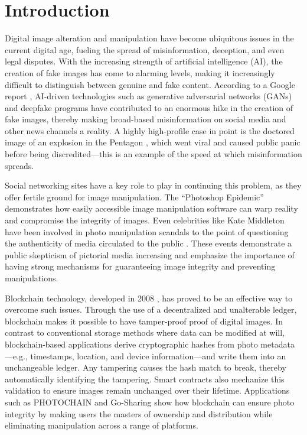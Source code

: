 \chapter{Introduction}

Digital image alteration and manipulation have become ubiquitous issues in the current digital age,
fueling the spread of misinformation, deception, and even legal disputes. With the increasing
strength of artificial intelligence (AI), the creation of fake images has come to alarming levels,
making it increasingly difficult to distinguish between genuine and fake content. According
to a Google report \cite{yang2024}, AI-driven technologies such as generative adversarial
networks (GANs) and deepfake programs have contributed to an enormous hike in the creation of
fake images, thereby making broad-based misinformation on social media and other news channels
a reality. A highly high-profile case in point is the doctored image of an explosion in the Pentagon
\cite{pentagonExplosion}, which went viral and caused public panic before being discredited---this
is an example of the speed at which misinformation spreads.

Social networking sites have a key role to play in continuing this problem, as they offer fertile
ground for image manipulation. The ``Photoshop Epidemic'' \cite{photoshopEpidemic} demonstrates
how easily accessible image manipulation software can warp reality and compromise the integrity
of images. Even celebrities like Kate Middleton have been involved in photo manipulation scandals
to the point of questioning the authenticity of media circulated to the public \cite{kateMiddletonControversy}.
These events demonstrate a public skepticism of pictorial media increasing and emphasize the
importance of having strong mechanisms for guaranteeing image integrity and preventing manipulations.

Blockchain technology, developed in 2008 \cite{nakamoto2008}, has proved to be an effective way
to overcome such issues. Through the use of a decentralized and unalterable ledger, blockchain
makes it possible to have tamper-proof proof of digital images. In contrast to conventional storage
methods where data can be modified at will, blockchain-based applications derive cryptographic
hashes from photo metadata---e.g., timestamps, location, and device information---and write them
into an unchangeable ledger. Any tampering causes the hash match to break, thereby automatically
identifying the tampering. Smart contracts also mechanize this validation to ensure images remain
unchanged over their lifetime. Applications such as PHOTOCHAIN and Go-Sharing show how blockchain
can ensure photo integrity by making users the masters of ownership and distribution while
eliminating manipulation across a range of platforms.

